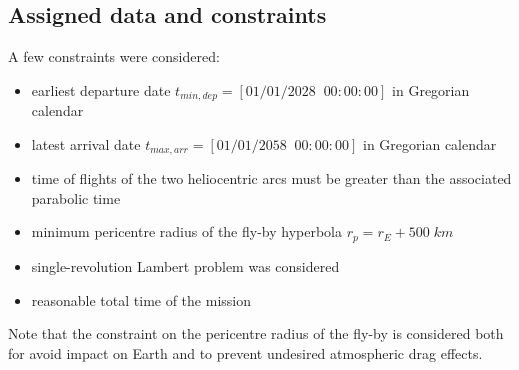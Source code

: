 \subsection{Assigned data and constraints}
\label{subsec:data_constraints}

A few constraints were considered:

\begin{itemize}
    [wide,itemsep=3pt,topsep=3pt]
    \item earliest departure date $t_{min,dep} = \left[01/01/2028 \;\; 00:00:00\right]$ in Gregorian calendar
    \item latest arrival date $t_{max,arr} = \left[01/01/2058 \;\; 00:00:00\right]$ in Gregorian calendar
    \item time of flights of the two heliocentric arcs must be greater than the associated parabolic time
    \item minimum pericentre radius of the fly-by hyperbola $r_p = r_E + 500 \; km$
    \item single-revolution Lambert problem was considered
    \item reasonable total time of the mission
\end{itemize}

Note that the constraint on the pericentre radius of the fly-by is considered both for avoid impact on Earth and to prevent undesired atmospheric drag effects.